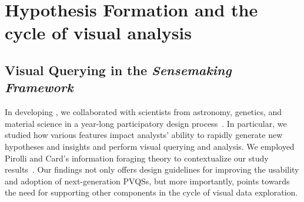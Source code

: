 \section{Hypothesis Formation and the cycle of visual analysis\label{sec:hypothesis}}
\subsection{Visual Querying in the \textit{Sensemaking Framework}}
In developing \zv, we collaborated with scientists from astronomy, genetics, and material science in a year-long participatory design process~\cite{Lee2017}. In particular, we studied how various features impact analysts' ability to rapidly generate new hypotheses and insights and perform visual querying and analysis. We employed Pirolli and Card's information foraging theory to contextualize our study results~\cite{Pirolli}. Our findings not only offers design guidelines for improving the usability and adoption of next-generation PVQSs, but more importantly, points towards the need for supporting other components in the cycle of visual data exploration. %
